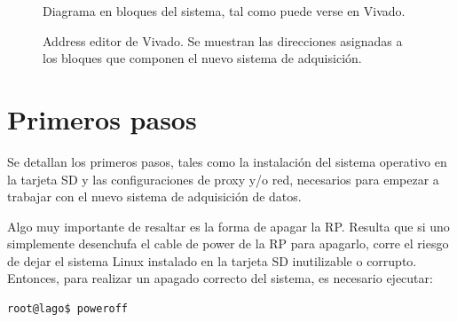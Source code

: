 \documentclass[a4paper,11pt]{article}
\begin{document}
\begin{figure}[!h]
  \centering
  \caption{Diagrama en bloques del sistema, tal como puede verse en Vivado.}
  \label{fig:bloques_vivado}
\end{figure}

\begin{figure}[!h]
  \centering
  \caption{Address editor de Vivado. Se muestran las direcciones asignadas a los
bloques que componen el nuevo sistema de adquisición.}
  \label{fig:addr_editor}
\end{figure}

\section{Primeros pasos}

Se detallan los primeros pasos, tales como la instalación del sistema operativo
en la tarjeta SD y las configuraciones de proxy y/o red, necesarios para
empezar a trabajar con el nuevo sistema de adquisición de datos.

\noindent Algo muy importante de resaltar es la forma de apagar la RP. Resulta que si uno
simplemente desenchufa el cable de power de la RP para apagarlo, corre el
riesgo de dejar el sistema Linux instalado en la tarjeta SD inutilizable o
corrupto. Entonces, para realizar un apagado correcto del sistema, es necesario
ejecutar:

\begin{verbatim}
root@lago$ poweroff
\end{verbatim}
\end{document}

